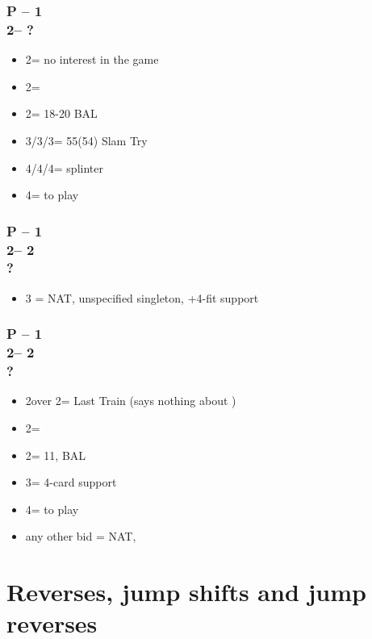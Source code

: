 \subsubsection*{P -- 1\spades \\ 2\clubs -- ?}
\begin{itemize}
    \item 2\spades = no interest in the game
    \item 2\diams = \inv
    \item 2\nt = 18-20 BAL
    \item 3\clubs/3\diams/3\hearts = 55(54) Slam Try
    \item 4\clubs/4\diams/4\hearts = splinter
    \item 4\spades = to play
\end{itemize}

\subsubsection*{P -- 1\majs \\ 2\clubs -- 2\majs \\ ?}
\begin{itemize}
    \item 3 = NAT, unspecified singleton, +4-fit \majs support
\end{itemize}

\subsubsection*{P -- 1\majs \\ 2\clubs -- 2\diams \\ ?}
\begin{itemize}
    \item 2\hearts over 2\spades = Last Train (says nothing about \hearts)
    \item 2\majs = \soff
    \item 2\nt = 11, BAL
    \item 3\majs = 4-card support
    \item 4\majs = to play
    \item any other bid = NAT, \inv
\end{itemize}

\section{\texorpdfstring{Reverses, jump shifts and jump reverses}{reverses}}\label{sec:reverses}

